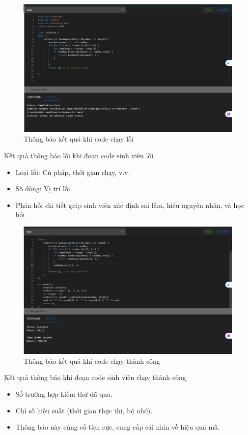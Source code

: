 \begin{figure}[H]
    \centering
    \includegraphics[width=0.8\linewidth]{images/code_run_error.png}
    \caption{Thông báo kết quả khi code chạy lỗi}
    \label{fig:enter-label}
\end{figure}
Kết quả thông báo lỗi khi đoạn code sinh viên lỗi
\begin{itemize}
    \item Loại lỗi: Cú pháp, thời gian chạy, v.v.
    \item Số dòng: Vị trí lỗi.
    \item Phản hồi chi tiết giúp sinh viên xác định sai lầm, hiểu nguyên nhân, và học hỏi.
\end{itemize}
\begin{figure}[H]
    \centering
    \includegraphics[width=0.8\linewidth]{images/code_run_success.png}
    \caption{Thông báo kết quả khi code chạy thành công}
    \label{fig:enter-label}
\end{figure}
Kết quả thông báo khi đoạn code sinh viên chạy thành công
\begin{itemize}
    \item Số trường hợp kiểm thử đã qua.
    \item Chỉ số hiệu suất (thời gian thực thi, bộ nhớ).
    \item Thông báo này củng cố tích cực, cung cấp cái nhìn về hiệu quả mã.
\end{itemize}